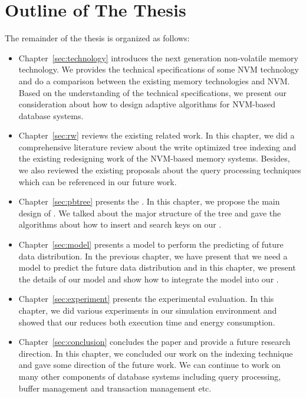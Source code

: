 \section{Outline of The Thesis}

The remainder of the thesis is organized as follows:

\begin{itemize}
  \item Chapter~\ref{sec:technology} introduces the next generation non-volatile memory technology. We provides the technical specifications of some NVM technology and do a comparison between the existing memory technologies and NVM. Based on the understanding of the technical specifications, we present our consideration about how to design adaptive algorithms for NVM-based database systems. 

  \item Chapter~\ref{sec:rw} reviews the existing related work. In this chapter, we did a comprehensive literature review about the write optimized tree indexing and the existing redesigning work of the NVM-based memory systems. Besides, we also reviewed the existing proposals about the query processing techniques which can be referenced in our future work. 

  \item Chapter~\ref{sec:pbtree} presents the \bptree. In this chapter, we propose the main design of \bptree. We talked about the major structure of the tree and gave the algorithms about how to insert and search keys on our \bptree.  
      
  \item Chapter~\ref{sec:model} presents a \predict model to perform the predicting of future data distribution. In the previous chapter, we have present that we need a \predict model to predict the future data distribution and in this chapter, we present the details of our \predict model and show how to integrate the \predict model into our \bptree.

  \item Chapter~\ref{sec:experiment} presents the experimental evaluation. In this chapter, we did various experiments in our simulation environment and showed that our \bptree reduces both execution time and energy consumption.
  
  \item Chapter~\ref{sec:conclusion} concludes the paper and provide a future research direction. In this chapter, we concluded our work on the indexing technique and gave some direction of the future work. We can continue to work on many other components of database systems including query processing, buffer management and transaction management etc. 
\end{itemize}

